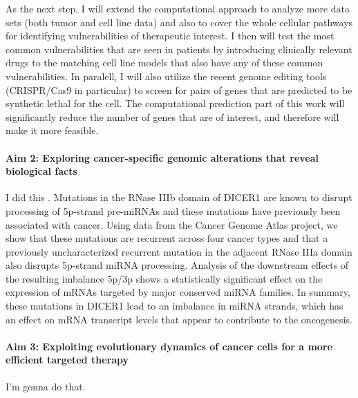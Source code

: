 \documentclass[11pt,letterpaper]{article}
\begin{document}
As the next step, I will extend the computational approach to analyze more data sets (both tumor and cell line data) and also to cover the whole cellular pathways for identifying vulnerabilities of therapeutic interest.
I then will test the most common vulnerabilities that are seen in patients by introducing clinically relevant drugs to the matching cell line models that also have any of these common vulnerabilities.
In paralell, I will also utilize the recent genome editing tools (CRISPR/Cas9 in particular)
to screen for pairs of genes that are predicted to be synthetic lethal for the cell.
The computational prediction part of this work will significantly reduce the number of genes that are of interest,
and therefore will make it more feasible.


\paragraph{Aim 2: Exploring cancer-specific genomic alterations that reveal biological facts}
I did this \cite{aksoy2014cancer}.
Mutations in the RNase IIIb domain of DICER1 are known to disrupt processing of 5p-strand pre-miRNAs and these mutations have previously been associated with cancer. 
Using data from the Cancer Genome Atlas project, we show that these mutations are recurrent across four cancer types and that a previously uncharacterized recurrent mutation in the adjacent RNase IIIa domain also disrupts 5p-strand miRNA processing. 
Analysis of the downstream effects of the resulting imbalance 5p/3p shows a statistically significant effect on the expression of mRNAs targeted by major conserved miRNA families. 
In summary, these mutations in DICER1 lead to an imbalance in miRNA strands, which has an effect on mRNA transcript levels that appear to contribute to the oncogenesis.

\paragraph{Aim 3: Exploiting evolutionary dynamics of cancer cells for a more efficient targeted therapy}
I'm gonna do that.

\clearpage

\footnotesize{
{}
}
\end{document}
